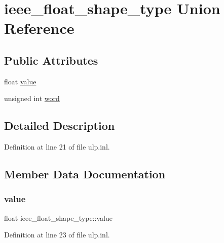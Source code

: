 \hypertarget{unionieee__float__shape__type}{}\section{ieee\+\_\+float\+\_\+shape\+\_\+type Union Reference}
\label{unionieee__float__shape__type}
\subsection*{Public Attributes}
\begin{DoxyCompactItemize}
\item 
float \mbox{\hyperlink{unionieee__float__shape__type_aa0c47451f1b974421cbb9e2833ddb68e}{value}}
\item 
unsigned int \mbox{\hyperlink{unionieee__float__shape__type_a49230c21acd672d044f38b1abcbd6071}{word}}
\end{DoxyCompactItemize}


\subsection{Detailed Description}


Definition at line 21 of file ulp.\+inl.



\subsection{Member Data Documentation}
\mbox{\label{unionieee__float__shape__type_aa0c47451f1b974421cbb9e2833ddb68e}} 
\subsubsection{\texorpdfstring{value}{value}}
{\footnotesize\ttfamily float ieee\+\_\+float\+\_\+shape\+\_\+type\+::value}



Definition at line 23 of file ulp.\+inl.

\mbox{\label{unionieee__float__shape__type_a49230c21acd672d044f38b1abcbd6071}} 
